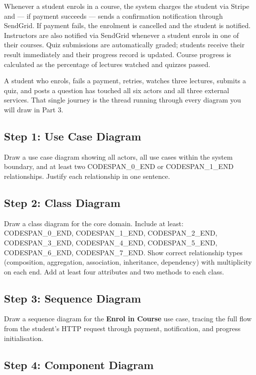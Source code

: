 \documentclass[11pt,a4paper]{book}
\begin{document}
Whenever a student enrols in a course, the system charges the student via Stripe and --- if payment succeeds --- sends a confirmation notification through SendGrid. If payment fails, the enrolment is cancelled and the student is notified. Instructors are also notified via SendGrid whenever a student enrols in one of their courses. Quiz submissions are automatically graded; students receive their result immediately and their progress record is updated. Course progress is calculated as the percentage of lectures watched and quizzes passed.

A student who enrols, fails a payment, retries, watches three lectures, submits a quiz, and posts a question has touched all six actors and all three external services. That single journey is the thread running through every diagram you will draw in Part 3.

\medskip

\subsection{Step 1: Use Case Diagram}

Draw a use case diagram showing all actors, all use cases within the system boundary, and at least two CODESPAN\_0\_END or CODESPAN\_1\_END relationships. Justify each relationship in one sentence.

\subsection{Step 2: Class Diagram}

Draw a class diagram for the core domain. Include at least: CODESPAN\_0\_END, CODESPAN\_1\_END, CODESPAN\_2\_END, CODESPAN\_3\_END, CODESPAN\_4\_END, CODESPAN\_5\_END, CODESPAN\_6\_END, CODESPAN\_7\_END. Show correct relationship types (composition, aggregation, association, inheritance, dependency) with multiplicity on each end. Add at least four attributes and two methods to each class.

\subsection{Step 3: Sequence Diagram}

Draw a sequence diagram for the \textbf{Enrol in Course} use case, tracing the full flow from the student's HTTP request through payment, notification, and progress initialisation.

\subsection{Step 4: Component Diagram}
\end{document}

